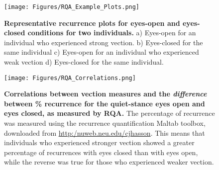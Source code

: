 \documentclass[11pt]{article}
\begin{document}
\begin{figure}[!ht]
\begin{center}
\texttt{[image: Figures/RQA\_Example\_Plots.png]}
\end{center}
\caption{{\bf Representative recurrence plots for eyes-open and eyes-closed conditions for two individuals.} a) Eyes-open for an individual who experienced strong vection. b) Eyes-closed for the same individual c) Eyes-open for an individual who experienced weak vection d) Eyes-closed for the same individual.}
\label{RQA_Plots}
\end{figure}


\begin{figure}[!ht]
\begin{center}
\texttt{[image: Figures/RQA\_Correlations.png]}
\end{center}
\caption{{\bf Correlations between vection measures and the \textit{difference} between \% recurrence for the quiet-stance eyes open and eyes closed, as measured by RQA.} The percentage of recurrence was measured using the recurrence quantification Maltab toolbox, downloaded from \href{http:/nuweb.neu.edu/cjhasson}{http:/nuweb.neu.edu/cjhasson}. This means that individuals who experienced stronger vection showed a greater percentage of recurrences with eyes closed than with eyes open, while the reverse was true for those who experienced weaker vection.}
\label{Recurrence_Correlations}
\end{figure}
\end{document}
